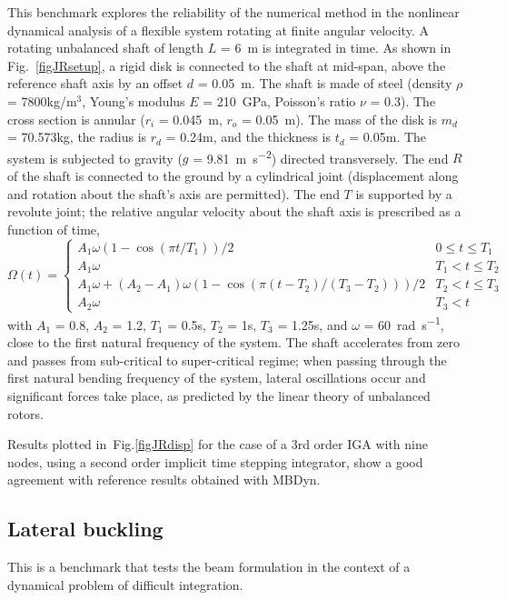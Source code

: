 \documentclass[review]{elsarticle}
\begin{document}
This benchmark explores the reliability of the numerical method in the nonlinear dynamical analysis
of a flexible system rotating at finite angular velocity.
A rotating unbalanced shaft of length $L$ = \SI{6}{\meter} is integrated in time.
As shown in Fig.~\ref{figJRsetup}, a rigid disk is connected to the shaft at mid-span,
above the reference shaft axis by an offset $d$ = \SI{0.05}{\meter}.
The shaft is made of steel (density $\rho$ = 7800kg/m$^3$,
Young's modulus $E$ = \SI{210}{\giga\pascal}, Poisson's ratio $\nu$ = 0.3).
The cross section is annular ($r_i$ = \SI{0.045}{\meter}, $r_o$ = \SI{0.05}{\meter}).
The mass of the disk is $m_d$ = 70.573kg,
the radius is $r_d$ = 0.24m,
and the thickness is $t_d$ = 0.05m.
The system is subjected to gravity ($g$ = \SI{9.81}{\meter\per\square\second})
directed transversely.
The end $R$ of the shaft is connected to the ground
by a cylindrical joint (displacement along and rotation
about the shaft's axis are permitted).
The end $T$ is supported by a revolute joint;
the relative angular velocity about the shaft axis is prescribed
as a function of time, %
\[
\Omega(t) = \left\{
\begin{array}{lr}
	A_1 \omega (1 - \cos(\pi t / T_1))/2 & 0 \le t \le T_1
	\\
	A_1 \omega & T_1 < t \le T_2
	\\
	A_1 \omega + (A_2 - A_1) \omega (1 - \cos(\pi (t - T_2)/(T_3 - T_2)))/2 & T_2 < t \le T_3
	\\
	A_2 \omega & T_3 < t
\end{array}
\right.
\]
with
$A_1$ = 0.8,
$A_2$ = 1.2,
$T_1$ = 0.5s,
$T_2$ = 1s,
$T_3$ = 1.25s, and
$\omega$ = \SI{60}{\radian\per\second}, close to the first natural frequency of the system.
%
The shaft accelerates from zero and passes from sub-critical to super-critical regime;
when passing through the first natural bending frequency of the system,
lateral oscillations occur and significant forces take place, as predicted
by the linear theory of unbalanced rotors.

Results plotted in~Fig.\ref{figJRdisp} for the case of a 3rd order IGA with nine nodes, using a second order implicit time stepping integrator, show a good agreement with reference results obtained with MBDyn.


\subsection{Lateral buckling}

This is a benchmark that tests the beam formulation in the context of a dynamical problem of difficult integration.
\end{document}
